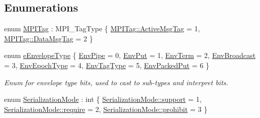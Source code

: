 \subsection*{Enumerations}
\begin{DoxyCompactItemize}
\item 
enum \hyperlink{namespacevt_1_1messaging_a1e0d9a8b346c8536b25544c725adcf55}{M\+P\+I\+Tag} \+: M\+P\+I\+\_\+\+Tag\+Type \{ \hyperlink{namespacevt_1_1messaging_a1e0d9a8b346c8536b25544c725adcf55ab1ee9044bcae54b74056a088a0d57ac1}{M\+P\+I\+Tag\+::\+Active\+Msg\+Tag} = 1, 
\hyperlink{namespacevt_1_1messaging_a1e0d9a8b346c8536b25544c725adcf55a9bee0499791527abc5fcf1099c3cc188}{M\+P\+I\+Tag\+::\+Data\+Msg\+Tag} = 2
 \}
\item 
enum \hyperlink{namespacevt_1_1messaging_a6508ef3a4701a2e6fd0bfe3edcc63a6c}{e\+Envelope\+Type} \{ \newline
\hyperlink{namespacevt_1_1messaging_a6508ef3a4701a2e6fd0bfe3edcc63a6ca3f3cc808029e09ae1e1727fcc0185853}{Env\+Pipe} = 0, 
\hyperlink{namespacevt_1_1messaging_a6508ef3a4701a2e6fd0bfe3edcc63a6ca336c26710ea637c75ac958d2d9ccab44}{Env\+Put} = 1, 
\hyperlink{namespacevt_1_1messaging_a6508ef3a4701a2e6fd0bfe3edcc63a6cab8e8cf33ab704f4caddd2d7bcc9268e8}{Env\+Term} = 2, 
\hyperlink{namespacevt_1_1messaging_a6508ef3a4701a2e6fd0bfe3edcc63a6caf1308b12de83b1b69acb484c507effb4}{Env\+Broadcast} = 3, 
\newline
\hyperlink{namespacevt_1_1messaging_a6508ef3a4701a2e6fd0bfe3edcc63a6caf3d587b9226f61f46fb0916af17120b7}{Env\+Epoch\+Type} = 4, 
\hyperlink{namespacevt_1_1messaging_a6508ef3a4701a2e6fd0bfe3edcc63a6ca26b9cbbc5e12dbc64f8906b505e7c37e}{Env\+Tag\+Type} = 5, 
\hyperlink{namespacevt_1_1messaging_a6508ef3a4701a2e6fd0bfe3edcc63a6ca2b7cfe3194094b03d3b7bccb05241824}{Env\+Packed\+Put} = 6
 \}\begin{DoxyCompactList}\small\item\em Enum for envelope type bits, used to cast to sub-\/types and interpret bits. \end{DoxyCompactList}
\item 
enum \hyperlink{namespacevt_1_1messaging_a436c5b9fc7f591e5978a136999cb9ef8}{Serialization\+Mode} \+: int \{ \hyperlink{namespacevt_1_1messaging_a436c5b9fc7f591e5978a136999cb9ef8a434990c8a25d2be94863561ae98bd682}{Serialization\+Mode\+::support} = 1, 
\hyperlink{namespacevt_1_1messaging_a436c5b9fc7f591e5978a136999cb9ef8af0ffd3b7c2574ac324603ed00488c850}{Serialization\+Mode\+::require} = 2, 
\hyperlink{namespacevt_1_1messaging_a436c5b9fc7f591e5978a136999cb9ef8abc56ee21f7c9d61984fde885e8ce116f}{Serialization\+Mode\+::prohibit} = 3
 \}
\end{DoxyCompactItemize}
